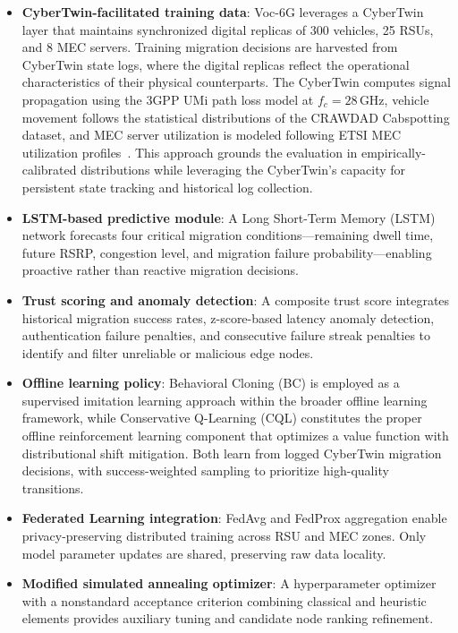 \documentclass[journal,twoside]{IEEEtran}
\newcommand{\VocSixG}{Voc-6G}
\begin{document}
\begin{itemize}
    \item \textbf{CyberTwin-facilitated training data}: \VocSixG{} leverages a CyberTwin layer that maintains synchronized digital replicas of 300 vehicles, 25 RSUs, and 8 MEC servers. Training migration decisions are harvested from CyberTwin state logs, where the digital replicas reflect the operational characteristics of their physical counterparts. The CyberTwin computes signal propagation using the 3GPP UMi path loss model at $f_c=28$\,GHz, vehicle movement follows the statistical distributions of the CRAWDAD Cabspotting dataset, and MEC server utilization is modeled following ETSI MEC utilization profiles~\cite{etsi_mec003}. This approach grounds the evaluation in empirically-calibrated distributions while leveraging the CyberTwin's capacity for persistent state tracking and historical log collection.

    \item \textbf{LSTM-based predictive module}: A Long Short-Term Memory (LSTM) network forecasts four critical migration conditions---remaining dwell time, future RSRP, congestion level, and migration failure probability---enabling proactive rather than reactive migration decisions.

    \item \textbf{Trust scoring and anomaly detection}: A composite trust score integrates historical migration success rates, z-score-based latency anomaly detection, authentication failure penalties, and consecutive failure streak penalties to identify and filter unreliable or malicious edge nodes.

    \item \textbf{Offline learning policy}: Behavioral Cloning (BC) is employed as a supervised imitation learning approach within the broader offline learning framework, while Conservative Q-Learning (CQL) constitutes the proper offline reinforcement learning component that optimizes a value function with distributional shift mitigation. Both learn from logged CyberTwin migration decisions, with success-weighted sampling to prioritize high-quality transitions.

    \item \textbf{Federated Learning integration}: FedAvg and FedProx aggregation enable privacy-preserving distributed training across RSU and MEC zones. Only model parameter updates are shared, preserving raw data locality.

    \item \textbf{Modified simulated annealing optimizer}: A hyperparameter optimizer with a nonstandard acceptance criterion combining classical and heuristic elements provides auxiliary tuning and candidate node ranking refinement.
\end{itemize}
\end{document}
